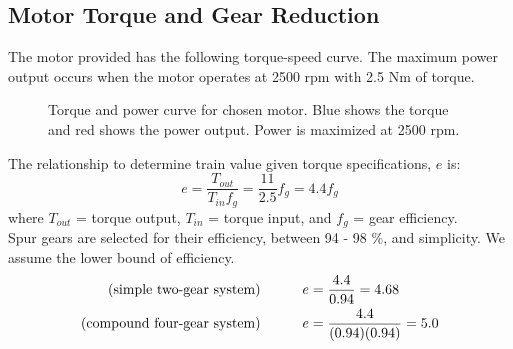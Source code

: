 \documentclass[letterpaper,12pt]{article}
\begin{document}
\subsection{Motor Torque and Gear Reduction}
The motor provided has the following torque-speed curve. The maximum power output occurs when the motor operates at 2500 rpm with 2.5 Nm of torque. \\

\begin{figure}[htbp] 
    \centering 
{}
\caption{Torque and power curve for chosen motor. Blue shows the torque and red shows the power output. Power is maximized at 2500 rpm.}
\end{figure}

The relationship to determine train value given torque specifications, $e$ is:
\begin{equation}
e = \frac{T_{out}}{T_{in} f_{g}} = \frac{11}{2.5} f_{g} = 4.4f_g
\end{equation}
where $T_{out}$ = torque output, $T_{in}$ = torque input, and $f_g$ = gear efficiency. \\
Spur gears are selected for their efficiency, between 94 - 98 \%, and simplicity. We assume the lower bound of efficiency. 
\begin{eqnarray}
\text{(simple two-gear system)}    \indent\indent &e = \displaystyle\frac{4.4}{ 0.94} = 4.68\\
\text{(compound four-gear system)} \indent\indent &e =  \displaystyle\frac{4.4}{ (0.94)(0.94)} = 5.0 
\end{eqnarray}
\end{document}
